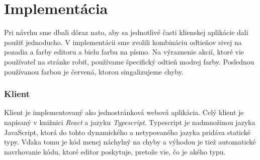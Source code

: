 \chapter{Implementácia}
Pri návrhu sme dbali dôraz nato, aby sa jednotlivé časti klienskej aplikácie dali použiť jednoducho.
V implementácii sme zvolili kombináciu oďtieňov sivej na pozadia a farby editoru a bielu farbu na
písmo. Na výraznenie akcií, ktoré vie používateľ na stránke robiť, používame špecifický odtieň
modrej farby. Poslednou používanou farbou je červená, ktorou singalizujeme chyby.

\subsection{Klient}
Klient je implementovaný ako jednostránková webová aplikácia. Celý klient je napísaný v knižnici
\textit{React} a jazyku \textit{Typescript}. Typescript je nadmnožinou jazyka JavaScript, ktorá do
tohto dynamického a netypovaného jazyka pridáva statické typy. Vďaka tomu je kód menej náchylný na
chyby a výhodou je tiež automatické navrhovanie kódu, ktoré editor poskytuje, pretože vie, čo je
akého typu. 

